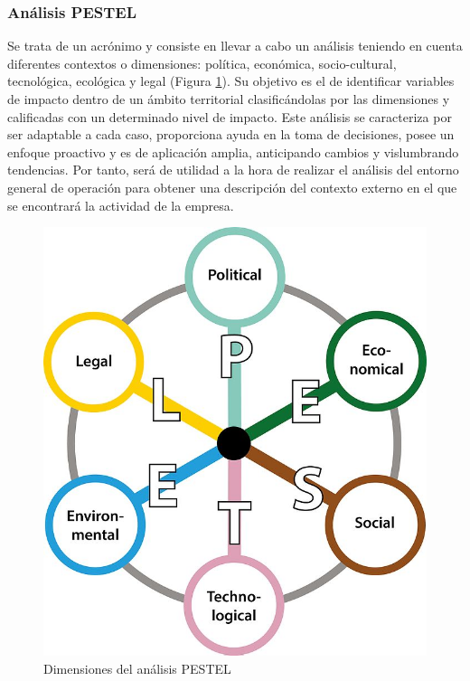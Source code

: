 \subsubsection{Análisis PESTEL}
Se trata de un acrónimo \cite{juanmartin2017} y consiste en llevar a cabo un análisis teniendo en cuenta diferentes contextos o dimensiones: política, económica, socio-cultural, tecnológica, ecológica y legal (Figura \ref{fig:pestel}). Su objetivo es el de identificar variables de impacto dentro de un ámbito territorial clasificándolas por las dimensiones y calificadas con un determinado nivel de impacto. Este análisis se caracteriza por ser adaptable a cada caso, proporciona ayuda en la toma de decisiones, posee un enfoque proactivo y es de aplicación amplia, anticipando cambios y vislumbrando tendencias. Por tanto, será de utilidad a la hora de realizar el análisis del entorno general de operación para obtener una descripción del contexto externo en el que se encontrará la actividad de la empresa.

\begin{figure}[h]
  \centering
  \includegraphics[width=0.45\linewidth]{figures/images/PESTEL.jpg}
  \caption{Dimensiones del análisis PESTEL}
  \label{fig:pestel}
\end{figure}

\clearpage

